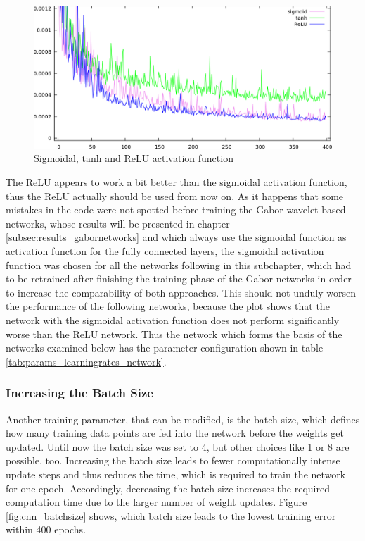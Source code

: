 \documentclass[11pt, a4paper]{article}
\begin{document}
\begin{figure}[h!]
	\centering
	\includegraphics[width=\textwidth]{results/cnn_sigmoid_vs_tanh_vs_relu.png}
	\caption{Sigmoidal, tanh and \ac{ReLU} activation function}
	\label{fig:cnn_sigmoid_vs_tanh_vs_relu}
\end{figure}
\vspace{-0.2cm}
The \ac{ReLU} appears to work a bit better than the sigmoidal activation function, thus the \ac{ReLU} actually should be used from now on. As it happens that some mistakes in the code were not spotted before training the Gabor wavelet based networks, whose results will be presented in chapter \ref{subsec:results_gabornetworks} and which always use the sigmoidal function as activation function for the fully connected layers, the sigmoidal activation function was chosen for all the networks following in this subchapter, which had to be retrained after finishing the training phase of the Gabor networks in order to increase the comparability of both approaches. This should not unduly worsen the performance of the following networks, because the plot shows that the network with the sigmoidal activation function does not perform significantly worse than the \ac{ReLU} network. Thus the network which forms the basis of the networks examined below has the parameter configuration shown in table \ref{tab:params_learningrates_network}.
\vspace{-0.6cm}


\subsubsection{Increasing the Batch Size}

Another training parameter, that can be modified, is the batch size, which defines how many training data points are fed into the network before the weights get updated. Until now the batch size was set to 4, but other choices like 1 or 8 are possible, too. Increasing the batch size leads to fewer computationally intense update steps and thus reduces the time, which is required to train the network for one epoch. Accordingly, decreasing the batch size increases the required computation time due to the larger number of weight updates. Figure \ref{fig:cnn_batchsize} shows, which batch size leads to the lowest training error within 400 epochs.
\end{document}
